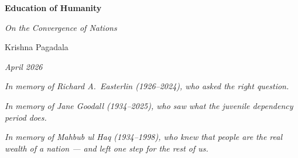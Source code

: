 \documentclass[12pt,letterpaper]{article}
\begin{document}
\begin{titlepage}
\begin{center}
\vspace*{2cm}
{\LARGE\bfseries Education of Humanity\par}
\vspace{0.5cm}
{\large\itshape On the Convergence of Nations\par}
\vspace{1.5cm}
{\large Krishna Pagadala\par}
\vspace{0.5cm}
{\normalsize\itshape April 2026\par}
\vspace{1cm}
{\small\itshape In memory of Richard A.\ Easterlin (1926--2024), who asked the right question.\par}
\vspace{0.5cm}
{\small\itshape In memory of Jane Goodall (1934--2025), who saw what the juvenile dependency period does.\par}
\vspace{0.5cm}
{\small\itshape In memory of Mahbub ul Haq (1934--1998), who knew that people are the real wealth of a nation --- and left one step for the rest of us.\par}
\vspace{1cm}
\end{center}

\begin{abstract}
\noindent Humans have the longest juvenile dependency of any species
--- nearly two decades of plastic brain embedded with dedicated adult
teachers. This is the substrate for cultural transmission. Cultural
transmission is not uniquely human; elephants, orcas, and apes all
transmit learned behaviour. What is uniquely human is cultural
transmission applied to tools that rebuild the environment, and to
the specialisation of individuals across them. Fire was the first;
agriculture, metallurgy, literacy, and medicine followed --- each a
culturally-transmitted tool that manipulates the environment at a
scale no individual could invent alone. Formal schooling is the
latest and highest-bandwidth payload ever delivered through this
channel.

I argue that education is the necessary and sufficient
cause of human development, and test the claim against a 185-country
panel (1950--2015) across four generational depths --- one century. The biological
prediction --- that an educated parent transmits norms, health
behaviours, and the expectation of school completion to children who
exercise these as household decisions \textasciitilde25 years later
--- is what the panel confirms. By 2022, 154 countries have crossed
both development thresholds (TFR below 3.65, life expectancy above
69.8 --- the 1960 United States values). Every one through
education.


\end{abstract}
\end{titlepage}
\end{document}
